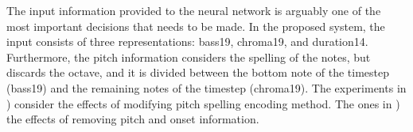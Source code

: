 
The input information provided to the neural network is
arguably one of the most important decisions that needs to
be made. In the proposed system, the input consists of three
representations: \gls{bass19}, \gls{chroma19}, and
\gls{duration14}. Furthermore, the pitch information
considers the spelling of the notes, but discards the
octave, and it is divided between the bottom note of the
timestep (\gls{bass19}) and the remaining notes of the
timestep (\gls{chroma19}). The experiments in
) consider the
effects of modifying pitch spelling encoding method. The
ones in ) the effects of
removing pitch and onset information.
